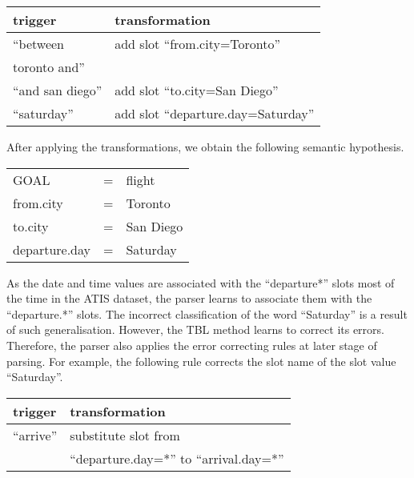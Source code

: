 \documentclass{article}
\begin{document}
\vspace{.15cm}
\begin{tabular}{ll}
  trigger & transformation \\
  \hline 
  ``between               & add slot ``from.city=Toronto'' \\
    toronto and''         &  \\
  ``and san diego''       & add slot ``to.city=San Diego'' \\
  ``saturday''            & add slot ``departure.day=Saturday'' \\
\end{tabular} 
\vspace{.15cm}

After applying the transformations, we obtain the following semantic hypothesis. 

\vspace{.15cm}
\begin{tabular}{lll}
  GOAL          & = & flight \\
  from.city     & = & Toronto \\
  to.city       & = & San Diego \\
  departure.day & = & Saturday \\
\end{tabular} 
\vspace{.15cm}



As the date and time values are associated with the ``departure*'' slots most of the time in the ATIS dataset,  
the parser learns to associate them with the ``departure.*'' slots. The incorrect classification of the word ``Saturday'' is a result of such generalisation. 
However, the TBL method learns to correct its errors. Therefore, the parser also applies the error correcting rules at later stage of parsing. For example, the following rule corrects the slot name of the slot value ``Saturday''.

\vspace{.15cm}
\begin{tabular}{ll}
  trigger & transformation \\
  \hline 
  ``arrive''            & substitute slot from\\
                        & ``departure.day=*'' to ``arrival.day=*'' \\
\end{tabular} 
\vspace{.15cm}
\end{document}
